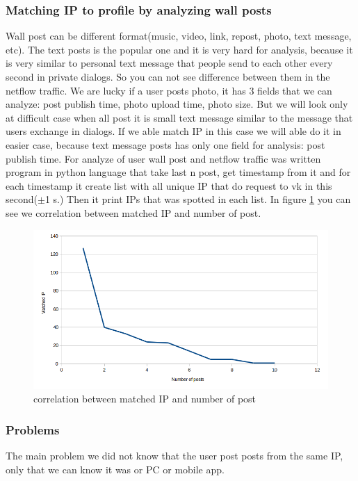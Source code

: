 \subsubsection{Matching IP to profile by analyzing wall posts}
Wall post can be different format(music, video, link, repost, photo, text message, etc). The text posts is the popular one and it is very hard for analysis, because it is very similar to personal text message that people send to each other every second in private dialogs. So you can not see difference between them in the netflow traffic. We are lucky if a user posts photo, it has 3 fields that we can analyze: post publish time, photo upload time, photo size. But we will look only at difficult case when all post it is small text message similar to the message that users exchange in dialogs. If we able match IP in this case we will able do it in easier case, because text message posts has only one field for analysis: post publish time. For analyze of user wall post and netflow traffic was written program in python language that take last n post, get timestamp from it and for each timestamp it create list with all unique IP that do request to vk in this second($\pm$1 s.) Then it print IPs that was spotted in each list. In figure \ref{fig:wall} you can see we correlation between matched IP and number of post. 
 
\begin{figure}[H]%
	\centering
		\includegraphics[width=180mm]{images/vk/wall.png}
	\caption{correlation between matched IP and number of post}
	\label{fig:wall}
\end{figure}

\subsubsection{Problems}
The main problem we did not know that the user post posts from the same IP, only that we can know it was or PC or mobile app. 

